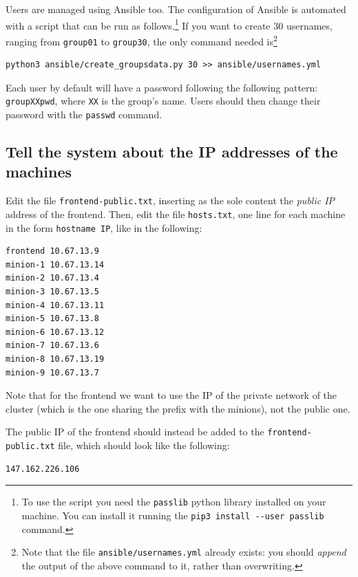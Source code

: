 \documentclass[justified]{tufte-handout}
\begin{document}
Users are managed using Ansible too. The configuration of Ansible is
automated with a script that can be run as follows.\footnote{To use the
  script you need the \texttt{passlib} python library installed on your
  machine. You can install it running the
  \texttt{pip3\ install\ -\/-user\ passlib} command.} If you want to
create 30 usernames, ranging from \texttt{group01} to \texttt{group30},
the only command needed is\footnote{\sloppy Note that the file
  \texttt{ansible/usernames.yml} already exists: you should
  \emph{append} the output of the above command to it, rather than
  overwriting.}

\begin{verbatim}
python3 ansible/create_groupsdata.py 30 >> ansible/usernames.yml
\end{verbatim}

Each user by default will have a password following the following
pattern: \texttt{groupXXpwd}, where \texttt{XX} is the group's name.
Users should then change their password with the \texttt{passwd}
command.

\subsection{Tell the system about the IP addresses of the
machines}\label{tell-the-system-about-the-ip-addresses-of-the-machines}

Edit the file \texttt{frontend-public.txt}, inserting as the sole
content the \emph{public IP} address of the frontend. Then, edit the
file \texttt{hosts.txt}, one line for each machine in the form
\texttt{hostname\ IP}, like in the following:

\begin{verbatim}
frontend 10.67.13.9
minion-1 10.67.13.14
minion-2 10.67.13.4
minion-3 10.67.13.5
minion-4 10.67.13.11
minion-5 10.67.13.8
minion-6 10.67.13.12
minion-7 10.67.13.6
minion-8 10.67.13.19
minion-9 10.67.13.7
\end{verbatim}

Note that for the frontend we want to use the IP of the private network
of the cluster (which is the one sharing the prefix with the minions),
not the public one.

The public IP of the frontend should instead be added to the
\texttt{frontend-public.txt} file, which should look like the following:

\begin{verbatim}
147.162.226.106
\end{verbatim}
\end{document}
